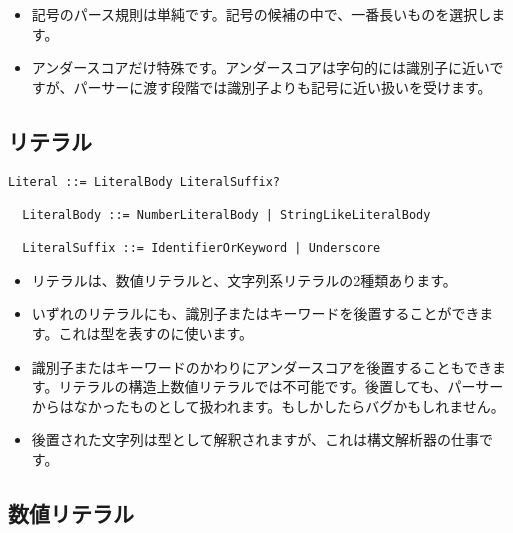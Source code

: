 \documentclass[dvipdfmx,uplatex,papersize,a4paper,10pt]{jsbook}
\theoremstyle{definition}
\begin{document}
\begin{itemize}
  \item 記号のパース規則は単純です。記号の候補の中で、一番長いものを選択します。
  \item アンダースコアだけ特殊です。アンダースコアは字句的には識別子に近いですが、パーサーに渡す段階では識別子よりも記号に近い扱いを受けます。
\end{itemize}

\subsection{リテラル}

\begin{lstlisting}[gobble=2]
  Literal ::= LiteralBody LiteralSuffix?

  LiteralBody ::= NumberLiteralBody | StringLikeLiteralBody

  LiteralSuffix ::= IdentifierOrKeyword | Underscore
\end{lstlisting}

\begin{itemize}
  \item リテラルは、数値リテラルと、文字列系リテラルの2種類あります。
  \item いずれのリテラルにも、識別子またはキーワードを後置することができます。これは型を表すのに使います。
  \item 識別子またはキーワードのかわりにアンダースコアを後置することもできます。リテラルの構造上数値リテラルでは不可能です。後置しても、パーサーからはなかったものとして扱われます。もしかしたらバグかもしれません。
  \item 後置された文字列は型として解釈されますが、これは構文解析器の仕事です。
\end{itemize}

\subsection{数値リテラル}
\end{document}
